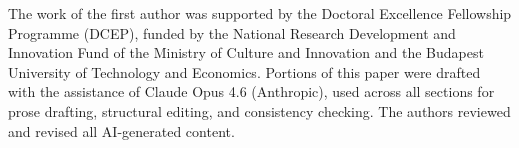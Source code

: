 \documentclass[sigconf,anonymous,review]{acmart}
\begin{document}

\maketitle









\begin{acks}
The work of the first author was supported by the Doctoral Excellence
Fellowship Programme (DCEP), funded by the National Research Development
and Innovation Fund of the Ministry of Culture and Innovation and the
Budapest University of Technology and Economics.
Portions of this paper were drafted with the assistance of Claude Opus 4.6 (Anthropic), used across all sections for prose drafting, structural editing, and consistency checking. The authors reviewed and revised all AI-generated content.
\end{acks}





\end{document}
